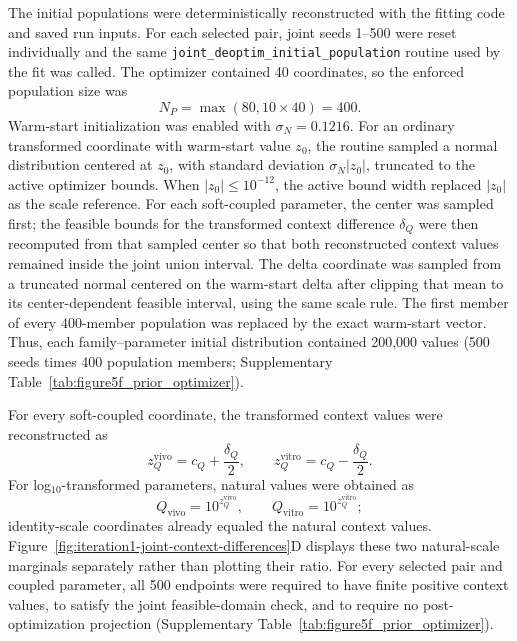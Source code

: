 \documentclass[11pt]{article}
\begin{document}
The initial populations were deterministically reconstructed with the fitting code and saved run inputs. For each selected pair, joint seeds 1--500 were reset individually and the same \texttt{joint\_deoptim\_initial\_population} routine used by the fit was called. The optimizer contained 40 coordinates, so the enforced population size was
\[
N_P=\max(80,10\times40)=400.
\]
Warm-start initialization was enabled with \(\sigma_N=0.1216\). For an ordinary transformed coordinate with warm-start value \(z_0\), the routine sampled a normal distribution centered at \(z_0\), with standard deviation \(\sigma_N|z_0|\), truncated to the active optimizer bounds. When \(|z_0|\le10^{-12}\), the active bound width replaced \(|z_0|\) as the scale reference. For each soft-coupled parameter, the center was sampled first; the feasible bounds for the transformed context difference \(\delta_Q\) were then recomputed from that sampled center so that both reconstructed context values remained inside the joint union interval. The delta coordinate was sampled from a truncated normal centered on the warm-start delta after clipping that mean to its center-dependent feasible interval, using the same scale rule. The first member of every 400-member population was replaced by the exact warm-start vector. Thus, each family--parameter initial distribution contained 200,000 values (500 seeds times 400 population members; Supplementary Table~\ref{tab:figure5f_prior_optimizer}).

For every soft-coupled coordinate, the transformed context values were reconstructed as
\begin{equation}
z_Q^{\mathrm{vivo}}=c_Q+\frac{\delta_Q}{2},
\qquad
z_Q^{\mathrm{vitro}}=c_Q-\frac{\delta_Q}{2}.
\label{eq:appendix_figure5f_context_reconstruction}
\end{equation}
For log$_{10}$-transformed parameters, natural values were obtained as
\begin{equation}
Q_{\mathrm{vivo}}=10^{z_Q^{\mathrm{vivo}}},
\qquad
Q_{\mathrm{vitro}}=10^{z_Q^{\mathrm{vitro}}};
\label{eq:appendix_figure5f_log_inverse}
\end{equation}
identity-scale coordinates already equaled the natural context values. Figure~\ref{fig:iteration1-joint-context-differences}D displays these two natural-scale marginals separately rather than plotting their ratio. For every selected pair and coupled parameter, all 500 endpoints were required to have finite positive context values, to satisfy the joint feasible-domain check, and to require no post-optimization projection (Supplementary Table~\ref{tab:figure5f_prior_optimizer}).
\end{document}

